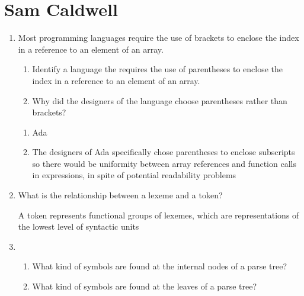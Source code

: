
\chapter{Sam Caldwell}

\begin{enumerate}
  \item Most programming languages require the use of brackets to
    enclose the index in a reference to an element of an array.
  \begin{enumerate}
    \item Identify a language the requires the use of parentheses
      to enclose the index in a reference to an element of an array.
    \item Why did the designers of the language choose parentheses
      rather than brackets?
    \end{enumerate}

  \begin{answer}

  \begin{enumerate}
    \item Ada
    \item The designers of Ada specifically chose parentheses to enclose subscripts so there would be uniformity between array references and function calls in expressions, in spite of potential readability problems
    \end{enumerate}

    \end{answer}
    
  \item What is the relationship between a lexeme and a token?

  \begin{answer}

    A token represents functional groups of lexemes, which are representations of the lowest level of syntactic units 

    \end{answer}

  \item
  \begin{enumerate}
    \item What kind of symbols are found at the internal nodes of a
      parse tree?
    \item What kind of symbols are found at the leaves of a parse tree?
    \end{enumerate}

  \begin{answer}


\end{answer}
\end{enumerate}
